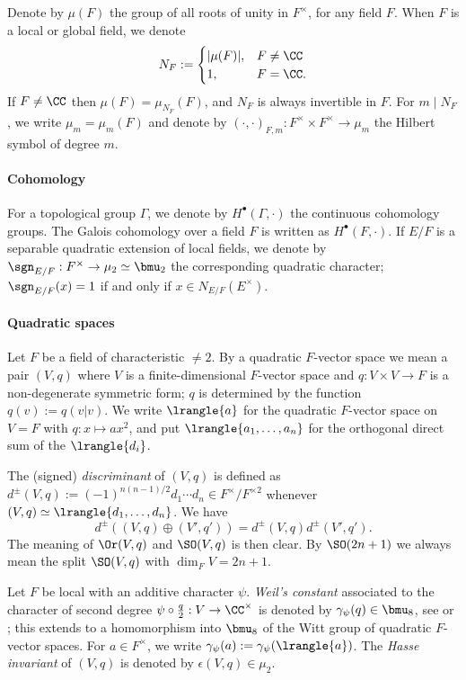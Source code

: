 \documentclass[a4paper,10pt]{article}
\begin{document}
Denote by $\mu(F)$ the group of all roots of unity in $F^\times$, for any field $F$. When $F$ is a local or global field, we denote 
\[ N_F := \begin{cases} |\mu(F)|, & F \neq \CC \\ 1, & F = \CC. \end{cases} \]
If $F \neq \CC$ then $\mu(F) = \mu_{N_F}(F)$, and $N_F$ is always invertible in $F$. For $m \mid N_F$, we write $\mu_m = \mu_m(F)$ and denote by $(\cdot, \cdot)_{F,m}: F^\times \times F^\times \to \mu_m$ the Hilbert symbol of degree $m$.

\paragraph{Cohomology}
For a topological group $\Gamma$, we denote by $H^\bullet(\Gamma, \cdot)$ the continuous cohomology groups. The Galois cohomology over a field $F$ is written as $H^\bullet(F, \cdot)$. If $E/F$ is a separable quadratic extension of local fields, we denote by $\sgn_{E/F}: F^\times \to \mu_2 \simeq \bmu_2$ the corresponding quadratic character; $\sgn_{E/F}(x)=1$ if and only if $x \in N_{E/F}(E^\times)$.

\paragraph{Quadratic spaces}
Let $F$ be a field of characteristic $\neq 2$. By a quadratic $F$-vector space we mean a pair $(V,q)$ where $V$ is a finite-dimensional $F$-vector space and $q: V \times V \to F$ is a non-degenerate symmetric form; $q$ is determined by the function $q(v) := q(v|v)$. We write $\lrangle{a}$ for the quadratic $F$-vector space on $V=F$ with $q: x \mapsto ax^2$, and put $\lrangle{a_1, \ldots, a_n}$ for the orthogonal direct sum of the $\lrangle{d_i}$.

The (signed) \emph{discriminant} of $(V,q)$ is defined as $d^\pm(V,q) := (-1)^{n(n-1)/2} d_1 \cdots d_n \in F^\times/F^{\times 2}$ whenever $(V,q) \simeq \lrangle{d_1, \ldots, d_n}$. We have
\[ d^\pm((V,q) \oplus (V', q')) = d^\pm(V,q) d^\pm(V', q'). \] 
The meaning of $\Or(V,q)$ and $\SO(V,q)$ is then clear. By $\SO(2n+1)$ we always mean the split $\SO(V,q)$ with $\dim_F V = 2n+1$.

Let $F$ be local with an additive character $\psi$. \emph{Weil's constant} associated to the character of second degree $\psi \circ \frac{q}{2}: V \to \CC^\times$ is denoted by $\gamma_\psi(q) \in \bmu_8$, see \cite[\S 24]{Weil64} or \cite[\S 1.3]{Per81}; this extends to a homomorphism into $\bmu_8$ of the Witt group of quadratic $F$-vector spaces. For $a \in F^\times$, we write $\gamma_\psi(a) := \gamma_\psi(\lrangle{a})$. The \emph{Hasse invariant} of $(V,q)$ is denoted by $\epsilon(V,q) \in \mu_2$. 
\end{document}
